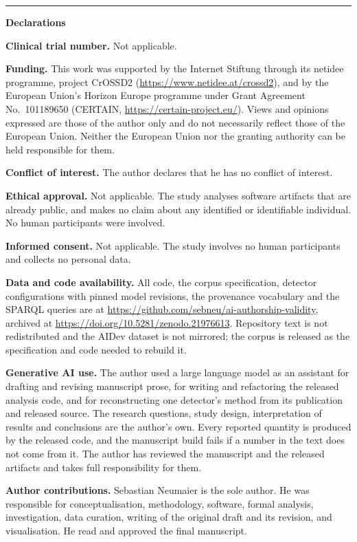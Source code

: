 \documentclass[11pt,a4paper]{article}
\begin{document}
\vspace{20pt}
\hrule
\vspace{14pt}

{\large\bfseries Declarations\par}
\vspace{6pt}

{\bfseries Clinical trial number.} Not applicable.

\vspace{6pt}
{\bfseries Funding.} This work was supported by the Internet Stiftung through its netidee programme, project
CrOSSD2 (\url{https://www.netidee.at/crossd2}), and by the European Union's Horizon
Europe programme under Grant Agreement No.\ 101189650 (CERTAIN,
\url{https://certain-project.eu/}). Views and opinions expressed are those of the author
only and do not necessarily reflect those of the European Union. Neither the European
Union nor the granting authority can be held responsible for them.

\vspace{6pt}
{\bfseries Conflict of interest.} The author declares that he has no conflict of
interest.

\vspace{6pt}
{\bfseries Ethical approval.} Not applicable. The study analyses software artifacts
that are already public, and makes no claim about any identified or identifiable
individual. No human participants were involved.

\vspace{6pt}
{\bfseries Informed consent.} Not applicable. The study involves no human
participants and collects no personal data.

\vspace{6pt}
{\bfseries Data and code availability.} All code, the corpus specification, detector
configurations with pinned model revisions, the provenance vocabulary and the SPARQL
queries are at \url{https://github.com/sebneu/ai-authorship-validity}, archived at
\url{https://doi.org/10.5281/zenodo.21976613}. Repository text is not redistributed and
the AIDev dataset is not mirrored; the corpus is released as the specification and code
needed to rebuild it.

\vspace{6pt}
{\bfseries Generative AI use.} The author used a large language model as an assistant
for drafting and revising manuscript prose, for writing and refactoring the released
analysis code, and for reconstructing one detector's method from its publication and
released source. The research questions, study design, interpretation of results and
conclusions are the author's own. Every reported quantity is produced by the released
code, and the manuscript build fails if a number in the text does not come from it. The
author has reviewed the manuscript and the released artifacts and takes full
responsibility for them.

\vspace{6pt}
{\bfseries Author contributions.} Sebastian Neumaier is the sole author. He was
responsible for conceptualisation, methodology, software, formal analysis,
investigation, data curation, writing of the original draft and its revision, and
visualisation. He read and approved the final manuscript.
\end{document}
